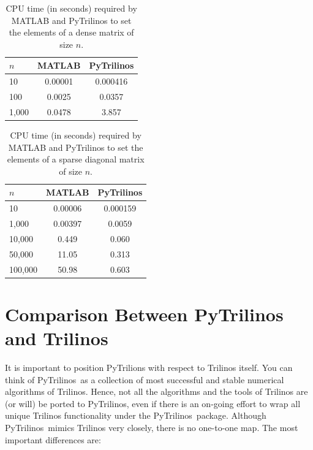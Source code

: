 \documentclass[10pt,relax]{SANDreport}
\newcommand{\PyTrilinos}{{PyTrilinos}}
\begin{document}
\begin{table}
\begin{center}
\begin{tabular}{| l | c | c |}
\hline
$n$ & MATLAB & PyTrilinos \\
\hline
\hline
10     & 0.00001 & 0.000416 \\
100    & 0.0025 & 0.0357 \\ 
1,000  & 0.0478 & 3.857 \\
\hline
\end{tabular}
\caption{CPU time (in seconds) required by MATLAB and PyTrilinos to set the
  elements of a  dense matrix of size $n$.}
\label{tab:matlab_dense}
\end{center}
\end{table}

\begin{table}
\begin{center}
\begin{tabular}{| l | c | c |}
\hline
$n$ & MATLAB & PyTrilinos \\
\hline
\hline
10      & 0.00006 & 0.000159 \\ 
1,000   & 0.00397 & 0.0059 \\
10,000  & 0.449   & 0.060 \\
50,000  & 11.05   & 0.313 \\
100,000 & 50.98   & 0.603 \\
\hline
\end{tabular}
\caption{CPU time (in seconds) required by MATLAB and PyTrilinos to set the
  elements of a  sparse diagonal matrix of size $n$.}
\label{tab:matlab_sparse}
\end{center}
\end{table}

\section{Comparison Between PyTrilinos and Trilinos}
\label{sec:comparison_trilinos}

It is  important to position PyTrilions with respect to Trilinos itself.
You can think of \PyTrilinos\ as a collection of most successful and
stable numerical algorithms of Trilinos.  Hence, not all the
algorithms and the tools of Trilinos are (or will) be ported to
\PyTrilinos, even if there is an on-going effort to wrap all unique
Trilinos functionality under the \PyTrilinos\ package.
Although \PyTrilinos\ mimics Trilinos very closely, there is
no one-to-one map. The most important differences are:
\end{document}
